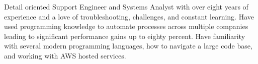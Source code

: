 \begin{cvparagraph}

Detail oriented Support Engineer and Systems Analyst with over eight years of experience and a love of troubleshooting, challenges, and constant learning. Have used programming knowledge to automate processes across multiple companies leading to significant performance gains up to eighty percent. Have familiarity with several modern programming languages, how to navigate a large code base, and working with AWS hosted services.  
\end{cvparagraph}